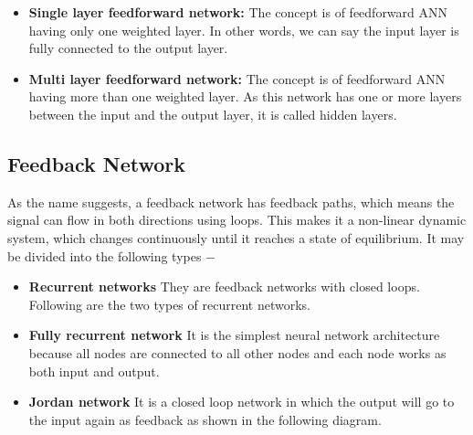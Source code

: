 \documentclass{report}
\begin{document}
\begin{itemize}
\item \textbf{Single layer feedforward network: } The concept is of feedforward ANN having only one weighted layer. In other words, we can say the input layer is fully connected to the output layer.

\end{itemize}


\begin{itemize}
\item \textbf{Multi layer feedforward network: } The concept is of feedforward ANN having more than one weighted layer. As this network has one or more layers between the input and the output layer, it is called hidden layers.


\end{itemize}


\subsection{Feedback Network}
As the name suggests, a feedback network has feedback paths, which means the signal can flow in both directions using loops. This makes it a non-linear dynamic system, which changes continuously until it reaches a state of equilibrium. It may be divided into the following types −

\begin{itemize}
\item \textbf{Recurrent networks} They are feedback networks with closed loops. Following are the two types of recurrent networks.

\item \textbf{Fully recurrent network} It is the simplest neural network architecture because all nodes are connected to all other nodes and each node works as both input and output.


\item \textbf{Jordan network} It is a closed loop network in which the output will go to the input again as feedback as shown in the following diagram.



\end{itemize}
\end{document}
